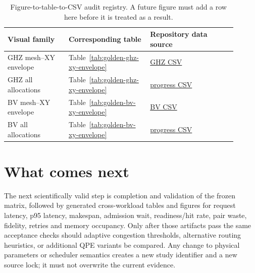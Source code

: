 \begin{table}[H]
\centering\small
\begin{tabular}{@{}p{0.24\linewidth}p{0.32\linewidth}p{0.34\linewidth}@{}}
\toprule
Visual family & Corresponding table & Repository data source \\ \midrule
GHZ mesh--XY envelope & Table~\ref{tab:golden-ghz-xy-envelope} & \href{https://github.com/sanjeevkrishnaa/Compiler-Driven-ACE/blob/codex/ace-scheduler-correctness/results/golden_study_2026-10-25/summaries/ghz_thqa_mesh_xy_memory_sweep_observed_minima.csv}{GHZ CSV} \\
GHZ all allocations & Table~\ref{tab:golden-ghz-xy-envelope} & \href{https://github.com/sanjeevkrishnaa/Compiler-Driven-ACE/blob/codex/ace-scheduler-correctness/results/golden_study_2026-10-25/summaries/base-evaluation-progress.csv}{progress CSV} \\
BV mesh--XY envelope & Table~\ref{tab:golden-bv-xy-envelope} & \href{https://github.com/sanjeevkrishnaa/Compiler-Driven-ACE/blob/codex/ace-scheduler-correctness/results/golden_study_2026-10-25/summaries/bv_thqa_mesh_xy_memory_sweep_observed_minima.csv}{BV CSV} \\
BV all allocations & Table~\ref{tab:golden-bv-xy-envelope} & \href{https://github.com/sanjeevkrishnaa/Compiler-Driven-ACE/blob/codex/ace-scheduler-correctness/results/golden_study_2026-10-25/summaries/base-evaluation-progress.csv}{progress CSV} \\
\bottomrule
\end{tabular}
\caption{Figure-to-table-to-CSV audit registry. A future figure must add a row here before it is treated as a result.}
\label{tab:figure-data-registry}
\end{table}

\section{What comes next}
The next scientifically valid step is completion and validation of the frozen
matrix, followed by generated cross-workload tables and figures for request
latency, p95 latency, makespan, admission wait, readiness/hit rate, pair waste,
fidelity, retries and memory occupancy. Only after those artifacts pass the same
acceptance checks should adaptive congestion thresholds, alternative routing
heuristics, or additional QPE variants be compared. Any change to physical
parameters or scheduler semantics creates a new study identifier and a new
source lock; it must not overwrite the current evidence.
